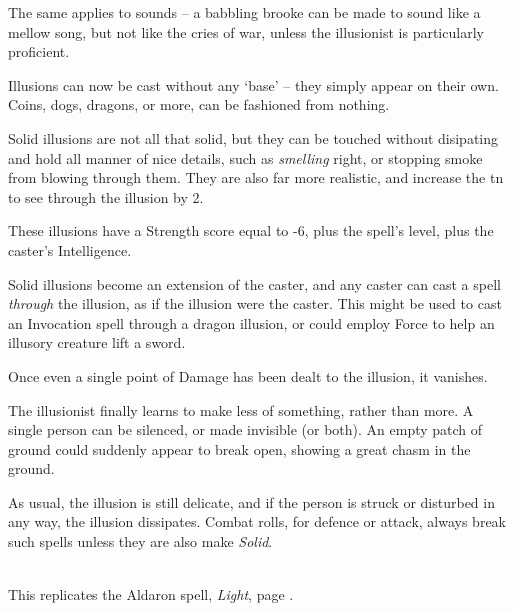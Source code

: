 \begin{multicols}{2}
The same applies to sounds -- a babbling brooke can be made to sound like a mellow song, but not like the cries of war, unless the illusionist is particularly proficient.


Illusions can now be cast without any `base' -- they simply appear on their own.
Coins, dogs, dragons, or more, can be fashioned from nothing.


Solid illusions are not all that solid, but they can be touched without disipating and hold all manner of nice details, such as \emph{smelling} right, or stopping smoke from blowing through them.  They are also far more realistic, and increase the \gls{tn} to see through the illusion by 2.

These illusions have a Strength score equal to -6, plus the spell's level, plus the caster's Intelligence.

Solid illusions become an extension of the caster, and any caster can cast a spell \textit{through} the illusion, as if the illusion were the caster.  This might be used to cast an Invocation spell through a dragon illusion, or could employ Force to help an illusory creature lift a sword.

Once even a single point of Damage has been dealt to the illusion, it vanishes.


The illusionist finally learns to make less of something, rather than more.  A single person can be silenced, or made invisible (or both).
An empty patch of ground could suddenly appear to break open, showing a great chasm in the ground.

As usual, the illusion is still delicate, and if the person is struck or disturbed in any way, the illusion dissipates.  Combat rolls, for defence or attack, always break such spells unless they are also make \textit{Solid}.

\\
This replicates the Aldaron spell, \textit{Light}, page \pageref{light}.

\end{multicols}


